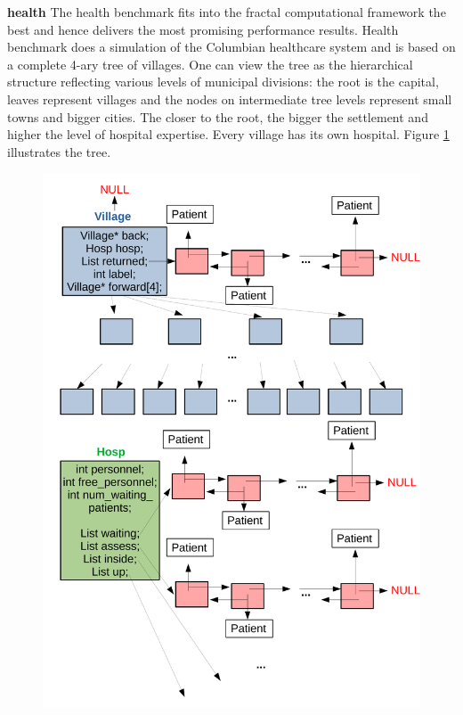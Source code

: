 \quad \textbf{health} \quad The health benchmark fits into the fractal computational framework the best and hence delivers the most promising performance results. Health benchmark does a simulation of the Columbian healthcare system and is based on a complete 4-ary tree of villages. One can view the tree as the hierarchical structure reflecting various levels of municipal divisions: the root is the capital, leaves represent villages and the nodes on intermediate tree levels represent small towns and bigger cities. The closer to the root, the bigger the settlement and higher the level of hospital expertise. Every village has its own hospital. Figure \ref{fig:health_benchmark} illustrates the tree.
\begin{figure}
\centering
\begin{minipage}{.5\textwidth}
  \centering
  \includegraphics[width=0.9\linewidth]{images/village_tree.pdf}
  \label{fig:health_benchmark}
\end{minipage}%
\begin{minipage}{.5\textwidth}

\end{minipage}
\end{figure}
